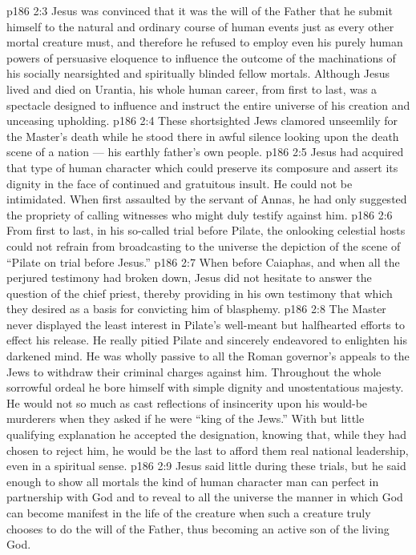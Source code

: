 \vs p186 2:3 Jesus was convinced that it was the will of the Father that he submit himself to the natural and ordinary course of human events just as every other mortal creature must, and therefore he refused to employ even his purely human powers of persuasive eloquence to influence the outcome of the machinations of his socially nearsighted and spiritually blinded fellow mortals. Although Jesus lived and died on Urantia, his whole human career, from first to last, was a spectacle designed to influence and instruct the entire universe of his creation and unceasing upholding.
\vs p186 2:4 \pc These shortsighted Jews clamored unseemlily for the Master’s death while he stood there in awful silence looking upon the death scene of a nation --- his earthly father’s own people.
\vs p186 2:5 \pc Jesus had acquired that type of human character which could preserve its composure and assert its dignity in the face of continued and gratuitous insult. He could not be intimidated. When first assaulted by the servant of Annas, he had only suggested the propriety of calling witnesses who might duly testify against him.
\vs p186 2:6 From first to last, in his so\hyp{}called trial before Pilate, the onlooking celestial hosts could not refrain from broadcasting to the universe the depiction of the scene of “Pilate on trial before Jesus.”
\vs p186 2:7 When before Caiaphas, and when all the perjured testimony had broken down, Jesus did not hesitate to answer the question of the chief priest, thereby providing in his own testimony that which they desired as a basis for convicting him of blasphemy.
\vs p186 2:8 The Master never displayed the least interest in Pilate’s well\hyp{}meant but halfhearted efforts to effect his release. He really pitied Pilate and sincerely endeavored to enlighten his darkened mind. He was wholly passive to all the Roman governor’s appeals to the Jews to withdraw their criminal charges against him. Throughout the whole sorrowful ordeal he bore himself with simple dignity and unostentatious majesty. He would not so much as cast reflections of insincerity upon his would\hyp{}be murderers when they asked if he were “king of the Jews.” With but little qualifying explanation he accepted the designation, knowing that, while they had chosen to reject him, he would be the last to afford them real national leadership, even in a spiritual sense.
\vs p186 2:9 Jesus said little during these trials, but he said enough to show all mortals the kind of human character man can perfect in partnership with God and to reveal to all the universe the manner in which God can become manifest in the life of the creature when such a creature truly chooses to do the will of the Father, thus becoming an active son of the living God.
